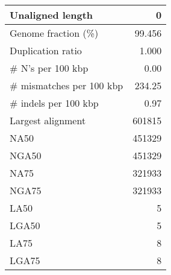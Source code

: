 \documentclass[12pt,a4paper]{article}
\begin{document}
\begin{table}[ht]
\begin{center}
\begin{tabular}{|l*{1}{|r}|}
Unaligned length & 0 \\ \hline
Genome fraction (\%) & 99.456 \\ \hline
Duplication ratio & 1.000 \\ \hline
\# N's per 100 kbp & 0.00 \\ \hline
\# mismatches per 100 kbp & 234.25 \\ \hline
\# indels per 100 kbp & 0.97 \\ \hline
Largest alignment & 601815 \\ \hline
NA50 & 451329 \\ \hline
NGA50 & 451329 \\ \hline
NA75 & 321933 \\ \hline
NGA75 & 321933 \\ \hline
LA50 & 5 \\ \hline
LGA50 & 5 \\ \hline
LA75 & 8 \\ \hline
LGA75 & 8 \\ \hline
\end{tabular}
\end{center}
\end{table}
\end{document}
